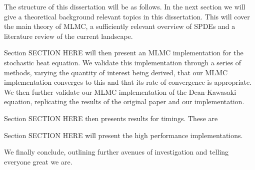 The structure of this dissertation will be as follows. In the next section we will 
give a theoretical background relevant topics in this dissertation. This will cover 
the main theory of MLMC, a sufficiently relevant overview of SPDEs and a literature
review of the current landscape.

Section SECTION HERE will then present an MLMC implementation for the 
stochastic heat equation. We  validate this implementation through a series of methods, 
varying the quantity of interest being derived, that our MLMC implementation 
converges to this and that its rate of convergence is appropriate. We then 
further validate our MLMC implementation of the Dean-Kawasaki equation, replicating 
the results of the original paper and our implementation.

Section SECTION HERE then presents results for timings. These are 


Section SECTION HERE will present the high performance implementations. 

We finally conclude, outlining further avenues of investigation and telling everyone
great we are.

